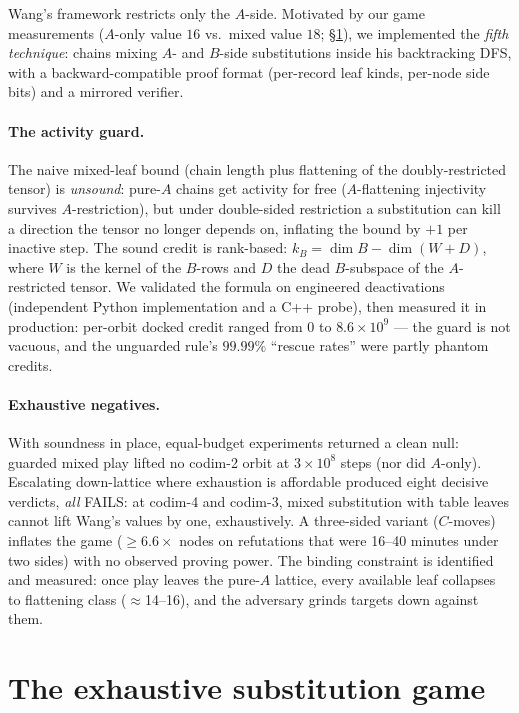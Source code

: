 \documentclass[11pt]{article}
\theoremstyle{definition}
\begin{document}
Wang's framework restricts only the $A$-side. Motivated by our game
measurements ($A$-only value $16$ vs.\ mixed value $18$;
\S\ref{sec:game}), we implemented the \emph{fifth technique}: chains
mixing $A$- and $B$-side substitutions inside his backtracking DFS, with a
backward-compatible proof format (per-record leaf kinds, per-node side
bits) and a mirrored verifier.

\paragraph{The activity guard.} The naive mixed-leaf bound
(chain length plus flattening of the doubly-restricted tensor) is
\emph{unsound}: pure-$A$ chains get activity for free ($A$-flattening
injectivity survives $A$-restriction), but under double-sided restriction
a substitution can kill a direction the tensor no longer depends on,
inflating the bound by $+1$ per inactive step. The sound credit is
rank-based: $k_B = \dim B - \dim(W + D)$, where $W$ is the kernel of the
$B$-rows and $D$ the dead $B$-subspace of the $A$-restricted tensor. We
validated the formula on engineered deactivations (independent Python
implementation and a C++ probe), then measured it in production: per-orbit
docked credit ranged from $0$ to $8.6\times 10^9$ --- the guard is not
vacuous, and the unguarded rule's $99.99\%$ ``rescue rates'' were partly
phantom credits.

\paragraph{Exhaustive negatives.} With soundness in place, equal-budget
experiments returned a clean null: guarded mixed play lifted no codim-2
orbit at $3\times 10^8$ steps (nor did $A$-only). Escalating down-lattice
where exhaustion is affordable produced eight decisive verdicts, \emph{all}
FAILS: at codim-4 and codim-3, mixed substitution with table leaves cannot
lift Wang's values by one, exhaustively. A three-sided variant ($C$-moves)
inflates the game ($\ge 6.6\times$ nodes on refutations that were
16--40 minutes under two sides) with no observed proving power. The
binding constraint is identified and measured: once play leaves the
pure-$A$ lattice, every available leaf collapses to flattening class
($\approx$14--16), and the adversary grinds targets down against them.

\section{The exhaustive substitution game}
\label{sec:game}
\end{document}
